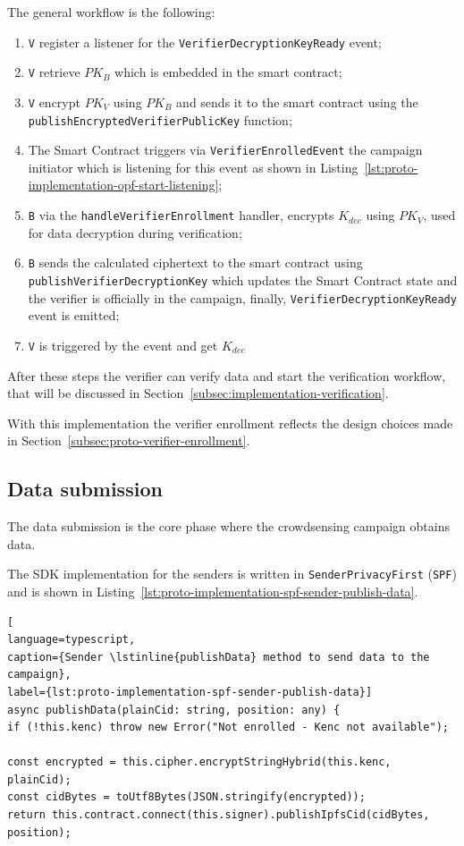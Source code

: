 The general workflow is the following:
\begin{enumerate}
    \item \texttt{V} register a listener for the \lstinline{VerifierDecryptionKeyReady} event;
    \item \texttt{V} retrieve $PK_B$ which is embedded in the smart contract;
    \item \texttt{V} encrypt $PK_V$ using $PK_B$ and sends it to the smart contract using the \lstinline{publishEncryptedVerifierPublicKey} function;
    \item The Smart Contract triggers via \lstinline{VerifierEnrolledEvent} the campaign initiator which is listening for this event as shown in Listing~\ref{lst:proto-implementation-opf-start-listening};
    \item \texttt{B} via the \lstinline{handleVerifierEnrollment} handler, encrypts $K_{dec}$ using $PK_V$, used for data decryption during verification;
    \item \texttt{B} sends the calculated ciphertext to the smart contract using \lstinline{publishVerifierDecryptionKey} which updates the Smart Contract state and the verifier is officially in the campaign, finally, \lstinline{VerifierDecryptionKeyReady} event is emitted;
    \item \texttt{V} is triggered by the event and get $K_{dec}$
\end{enumerate}

After these steps the verifier can verify data and start the verification workflow, that will be discussed in Section~\ref{subsec:implementation-verification}.

With this implementation the verifier enrollment reflects the design choices made in Section~\ref{subsec:proto-verifier-enrollment}.

\subsection{Data submission}\label{subsec:implementation-data-submission}
The data submission is the core phase where the crowdsensing campaign obtains data.

The SDK implementation for the senders is written in \texttt{SenderPrivacyFirst} (\texttt{SPF}) and is shown in Listing~\ref{lst:proto-implementation-spf-sender-publish-data}.
\begin{lstlisting}[
language=typescript,
caption={Sender \lstinline{publishData} method to send data to the campaign},
label={lst:proto-implementation-spf-sender-publish-data}]
async publishData(plainCid: string, position: any) {
if (!this.kenc) throw new Error("Not enrolled - Kenc not available");

const encrypted = this.cipher.encryptStringHybrid(this.kenc, plainCid);
const cidBytes = toUtf8Bytes(JSON.stringify(encrypted));
return this.contract.connect(this.signer).publishIpfsCid(cidBytes, position);
\end{lstlisting}


